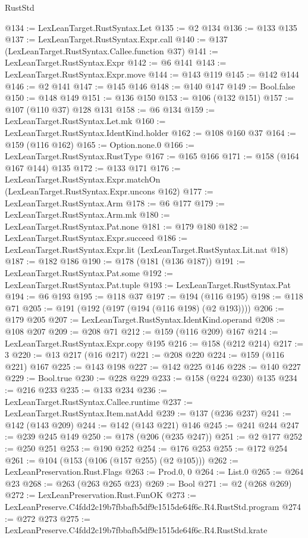 \begin{lexlean}{RustStd}
\begin{coremodule}
@134 := LexLeanTarget.RustSyntax.Let
@135 := @2 @134
@136 := @133 @135
@137 := LexLeanTarget.RustSyntax.Expr.call
@140 := @137 (LexLeanTarget.RustSyntax.Callee.function @37)
@141 := LexLeanTarget.RustSyntax.Expr
@142 := @6 @141
@143 := LexLeanTarget.RustSyntax.Expr.move
@144 := @143 @119
@145 := @142 @144
@146 := @2 @141
@147 := @145 @146
@148 := @140 @147
@149 := Bool.false
@150 := @148 @149
@151 := @136 @150
@153 := @106 (@132 @151)
@157 := @107 (@110 @37) @128 @131
@158 := @6 @134
@159 := LexLeanTarget.RustSyntax.Let.mk
@160 := LexLeanTarget.RustSyntax.IdentKind.holder
@162 := @108 @160 @37
@164 := @159 (@116 @162)
@165 := Option.none.{0}
@166 := LexLeanTarget.RustSyntax.RustType
@167 := @165 @166
@171 := @158 (@164 @167 @144) @135
@172 := @133 @171
@176 := LexLeanTarget.RustSyntax.Expr.matchOn (LexLeanTarget.RustSyntax.Expr.uncons @162)
@177 := LexLeanTarget.RustSyntax.Arm
@178 := @6 @177
@179 := LexLeanTarget.RustSyntax.Arm.mk
@180 := LexLeanTarget.RustSyntax.Pat.none
@181 := @179 @180
@182 := LexLeanTarget.RustSyntax.Expr.succeed
@186 := LexLeanTarget.RustSyntax.Expr.lit (LexLeanTarget.RustSyntax.Lit.nat @18)
@187 := @182 @186
@190 := @178 (@181 (@136 @187))
@191 := LexLeanTarget.RustSyntax.Pat.some
@192 := LexLeanTarget.RustSyntax.Pat.tuple
@193 := LexLeanTarget.RustSyntax.Pat
@194 := @6 @193
@195 := @118 @37
@197 := @194 (@116 @195)
@198 := @118 @71
@205 := @191 (@192 (@197 (@194 (@116 @198) (@2 @193))))
@206 := @179 @205
@207 := LexLeanTarget.RustSyntax.IdentKind.operand
@208 := @108 @207
@209 := @208 @71
@212 := @159 (@116 @209) @167
@214 := LexLeanTarget.RustSyntax.Expr.copy @195
@216 := @158 (@212 @214)
@217 := 3
@220 := @13 @217 (@16 @217)
@221 := @208 @220
@224 := @159 (@116 @221) @167
@225 := @143 @198
@227 := @142 @225 @146
@228 := @140 @227
@229 := Bool.true
@230 := @228 @229
@233 := @158 (@224 @230) @135
@234 := @216 @233
@235 := @133 @234
@236 := LexLeanTarget.RustSyntax.Callee.runtime
@237 := LexLeanTarget.RustSyntax.Item.natAdd
@239 := @137 (@236 @237)
@241 := @142 (@143 @209)
@244 := @142 (@143 @221) @146
@245 := @241 @244
@247 := @239 @245 @149
@250 := @178 (@206 (@235 @247))
@251 := @2 @177
@252 := @250 @251
@253 := @190 @252
@254 := @176 @253
@255 := @172 @254
@261 := @104 (@153 (@106 (@157 @255) (@2 @105)))
@262 := LexLeanPreservation.Rust.Flags
@263 := Prod.{0, 0}
@264 := List.{0}
@265 := @264 @23
@268 := @263 (@263 @265 @23)
@269 := Bool
@271 := @2 (@268 @269)
@272 := LexLeanPreservation.Rust.FunOK
@273 := LexLeanPreserve.C4fdd2c19b7fbbafb5df9c1515de64f6c.R4.RustStd.program
@274 := @272 @273
@275 := LexLeanPreserve.C4fdd2c19b7fbbafb5df9c1515de64f6c.R4.RustStd.krate

\end{coremodule}
\end{lexlean}

